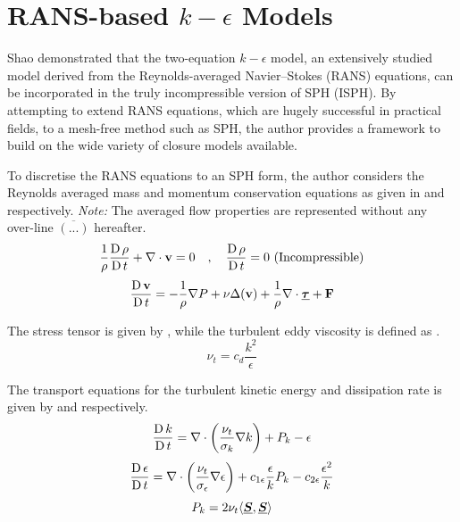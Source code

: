 \section[RANS-based k-epsilon Models]{RANS-based $k-\epsilon$ Models}
\label{sec:rans-based-k-epsilon-model}

Shao \parencite{Shao2006} demonstrated that the two-equation $k-\epsilon$ model, an extensively studied model derived from the Reynolds-averaged Navier–Stokes (RANS) equations, can be incorporated in the truly incompressible version of SPH (ISPH). By attempting to extend RANS equations, which are hugely successful in practical fields, to a mesh-free method such as SPH, the author provides a framework to build on the wide variety of closure models available.

To discretise the RANS equations to an SPH form, the author considers the Reynolds averaged mass and momentum conservation equations as given in  and  respectively. \textit{Note:} The averaged flow properties are represented without any over-line $\overline{(...)}$ hereafter.
\begin{equation}
    \frac{1}{\rho} \frac{\operatorname{D} \rho}{\operatorname{D} t} + \nabla \cdot \mathbf{v} = 0 \quad , \quad \frac{\operatorname{D} \rho}{\operatorname{D} t} = 0 \text{ (Incompressible)}
    \label{eq:Shao2006-rans-continuity-governing}
\end{equation}
\begin{equation}
    \frac{\operatorname{D} \mathbf{v}}{\operatorname{D} t} = -\frac{1}{\rho}\nabla P + \nu \Delta( \mathbf{v} ) + \frac{1}{\rho} \nabla \cdot \underline{\bm{\tau}} + \mathbf{F}
    \label{eq:Shao2006-rans-mom-governing}
\end{equation}

The stress tensor is given by , while the turbulent eddy viscosity is defined as .
\begin{equation}
    \nu_t = c_d \frac{k^2}{\epsilon}
    \label{eq:Shao2006-turbulent-eddy-visc}
\end{equation}

The transport equations for the turbulent kinetic energy and dissipation rate is given by  and  respectively.
\begin{equation}
    \frac{\operatorname{D} k}{\operatorname{D} t} = \nabla \cdot \bigg( \frac{\nu_t}{\sigma_k} \nabla k \bigg) + P_k - \epsilon
    \label{eq:Shao2006-k-transport-eq}
\end{equation}
\begin{equation}
    \frac{\operatorname{D} \epsilon}{\operatorname{D} t} = \nabla \cdot \bigg( \frac{\nu_t}{\sigma_{\epsilon}} \nabla \epsilon \bigg) + c_{1\epsilon} \frac{\epsilon}{k} P_k - c_{2\epsilon} \frac{\epsilon^2}{k}
    \label{eq:Shao2006-eps-transport-eq}
\end{equation}
\begin{equation}
    P_k = 2\nu_t \langle \underline{\bm{S}}, \underline{\bm{S}} \rangle
    \label{eq:Shao2006-k-production-term}
\end{equation}

